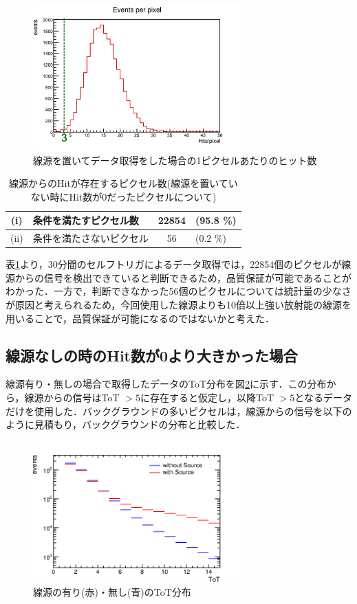 \begin{figure}[h]
  \centering
  \includegraphics[width=8cm]{./figure/selfperpix.png}
  \caption{線源を置いてデータ取得をした場合の1ピクセルあたりのヒット数}
  \label{fig:numhitdist}
\end{figure}

\begin{table}[h]
  \centering
  \caption{線源からのHitが存在するピクセル数(線源を置いていない時にHit数が0だったピクセルについて)}
  \begin{tabular}{|cl|cl|} \hline
    (i) & 条件を満たすピクセル数 & 22854 & (95.8 \%) \\ \hline
    (ii) & 条件を満たさないピクセル & 56 & (0.2 \%) \\ \hline
  \end{tabular}
  \label{tab:0hitdist}
\end{table}

表\ref{tab:0hitdist}より，30分間のセルフトリガによるデータ取得では，22854個のピクセルが線源からの信号を検出できていると判断できるため，品質保証が可能であることがわかった．一方で，判断できなかった56個のピクセルについては統計量の少なさが原因と考えられるため，今回使用した線源よりも10倍以上強い放射能の線源を用いることで，品質保証が可能になるのではないかと考えた．

\subsection*{線源なしの時のHit数が0より大きかった場合}
線源有り・無しの場合で取得したデータのToT分布を図\ref{fig:selftot}に示す．この分布から，線源からの信号はToT $> 5$に存在すると仮定し，以降ToT $>5$となるデータだけを使用した．バックグラウンドの多いピクセルは，線源からの信号を以下のように見積もり，バックグラウンドの分布と比較した．

\begin{figure}[h]
  \centering
  \includegraphics[width=8cm]{./figure/selftot.png}
  \caption{線源の有り(赤)・無し(青)のToT分布}
  \label{fig:selftot}
\end{figure}


